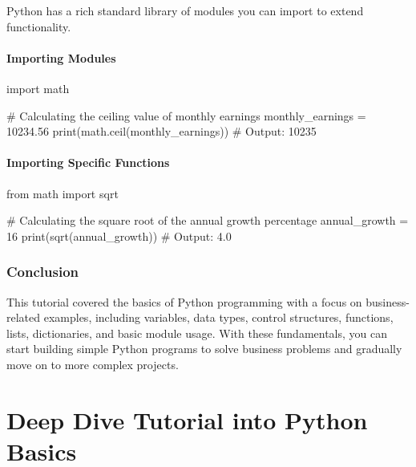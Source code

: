 \documentclass[
  letterpaper,
  DIV=11,
  numbers=noendperiod]{scrreprt}
\newenvironment{Shaded}{\begin{snugshade}}{\end{snugshade}}
\newcommand{\BuiltInTok}[1]{\textcolor[rgb]{0.00,0.23,0.31}{#1}}
\newcommand{\CommentTok}[1]{\textcolor[rgb]{0.37,0.37,0.37}{#1}}
\newcommand{\DecValTok}[1]{\textcolor[rgb]{0.68,0.00,0.00}{#1}}
\newcommand{\FloatTok}[1]{\textcolor[rgb]{0.68,0.00,0.00}{#1}}
\newcommand{\ImportTok}[1]{\textcolor[rgb]{0.00,0.46,0.62}{#1}}
\newcommand{\NormalTok}[1]{\textcolor[rgb]{0.00,0.23,0.31}{#1}}
\newcommand{\OperatorTok}[1]{\textcolor[rgb]{0.37,0.37,0.37}{#1}}
\begin{document}
Python has a rich standard library of modules you can import to extend
functionality.

\subsubsection{Importing Modules}\label{importing-modules}

\begin{Shaded}
\begin{Highlighting}[]
\ImportTok{import}\NormalTok{ math}

\CommentTok{\# Calculating the ceiling value of monthly earnings}
\NormalTok{monthly\_earnings }\OperatorTok{=} \FloatTok{10234.56}
\BuiltInTok{print}\NormalTok{(math.ceil(monthly\_earnings))  }\CommentTok{\# Output: 10235}
\end{Highlighting}
\end{Shaded}

\subsubsection{Importing Specific
Functions}\label{importing-specific-functions}

\begin{Shaded}
\begin{Highlighting}[]
\ImportTok{from}\NormalTok{ math }\ImportTok{import}\NormalTok{ sqrt}

\CommentTok{\# Calculating the square root of the annual growth percentage}
\NormalTok{annual\_growth }\OperatorTok{=} \DecValTok{16}
\BuiltInTok{print}\NormalTok{(sqrt(annual\_growth))  }\CommentTok{\# Output: 4.0}
\end{Highlighting}
\end{Shaded}

\subsection{Conclusion}\label{conclusion}

This tutorial covered the basics of Python programming with a focus on
business-related examples, including variables, data types, control
structures, functions, lists, dictionaries, and basic module usage. With
these fundamentals, you can start building simple Python programs to
solve business problems and gradually move on to more complex projects.


\chapter{Deep Dive Tutorial into Python
Basics}\label{deep-dive-tutorial-into-python-basics}
\end{document}
